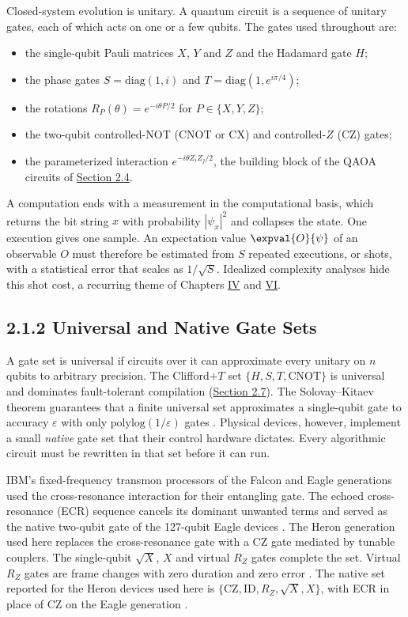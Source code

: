 \documentclass{report}
\theoremstyle{plain}
\theoremstyle{definition}
\theoremstyle{remark}
\newcommand{\eps}{\varepsilon}
\begin{document}
Closed-system evolution is unitary. A quantum circuit is a sequence of unitary gates, each of which acts on one or a few qubits. The gates used throughout are:
\begin{itemize}
\item the single-qubit Pauli matrices $X$, $Y$ and $Z$ and the Hadamard gate $H$;
\item the phase gates $S=\mathrm{diag}(1,i)$ and $T=\mathrm{diag}(1,e^{i\pi/4})$;
\item the rotations $R_P(\theta)=e^{-i\theta P/2}$ for $P\in\{X,Y,Z\}$;
\item the two-qubit controlled-NOT (CNOT or CX) and controlled-$Z$ (CZ) gates;
\item the parameterized interaction $e^{-i\theta Z_iZ_j/2}$, the building block of the QAOA circuits of \hyperref[sec:bg:vqa]{Section 2.4}.
\end{itemize}
A computation ends with a measurement in the computational basis, which returns the bit string $x$ with probability $|\psi_x|^2$ and collapses the state. One execution gives one sample. An expectation value $\expval{O}{\psi}$ of an observable $O$ must therefore be estimated from $S$ repeated executions, or shots, with a statistical error that scales as $1/\sqrt{S}$. Idealized complexity analyses hide this shot cost, a recurring theme of Chapters \hyperref[ch:qml]{IV} and \hyperref[ch:synthesis]{VI}.

\subsection{2.1.2 Universal and Native Gate Sets}

A gate set is universal if circuits over it can approximate every unitary on $n$ qubits to arbitrary precision. The Clifford$+T$ set $\{H,S,T,\mathrm{CNOT}\}$ is universal and dominates fault-tolerant compilation (\hyperref[sec:bg:qec]{Section 2.7}). The Solovay--Kitaev theorem guarantees that a finite universal set approximates a single-qubit gate to accuracy $\eps$ with only $\mathrm{polylog}(1/\eps)$ gates \cite{nielsen2010qcqi}. Physical devices, however, implement a small \emph{native} gate set that their control hardware dictates. Every algorithmic circuit must be rewritten in that set before it can run.

IBM's fixed-frequency transmon processors of the Falcon and Eagle generations used the cross-resonance interaction for their entangling gate. The echoed cross-resonance (ECR) sequence cancels its dominant unwanted terms and served as the native two-qubit gate of the 127-qubit Eagle devices \cite{sheldon2016echoedcr,bravyi2022futuresc}. The Heron generation used here replaces the cross-resonance gate with a CZ gate mediated by tunable couplers. The single-qubit $\sqrt{X}$, $X$ and virtual $R_Z$ gates complete the set. Virtual $R_Z$ gates are frame changes with zero duration and zero error \cite{mckay2017virtualz}. The native set reported for the Heron devices used here is $\{\mathrm{CZ},\mathrm{ID},R_Z,\sqrt{X},X\}$, with ECR in place of CZ on the Eagle generation \cite{guo2026rubriq}.
\end{document}
